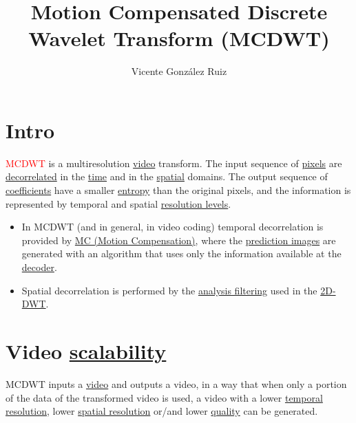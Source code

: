 
\title{Motion Compensated Discrete Wavelet Transform (MCDWT)}

\author{Vicente González Ruiz}

\maketitle
\section{Intro}

\textcolor{red}{MCDWT} is a multiresolution
\href{https://en.wikipedia.org/wiki/Video}{video} transform. The input
sequence of \href{https://en.wikipedia.org/wiki/Pixel}{pixels} are
\href{https://en.wikipedia.org/wiki/Decorrelation}{decorrelated} in
the \href{https://en.wikipedia.org/wiki/Time_domain}{time} and in the
\href{https://www.quora.com/What-is-spatial-domain-in-image-processing}{spatial}
domains. The output sequence of
\href{https://www.quora.com/What-is-spatial-domain-in-image-processing}{coefficients}
have a smaller \href{https://en.wikipedia.org/wiki/Entropy}{entropy}
than the original pixels, and the information is represented by
temporal and spatial
\href{https://en.wikipedia.org/wiki/Image_resolution}{resolution
  levels}.

\begin{itemize}
\item
  In MCDWT (and in general, in video coding) temporal decorrelation is
  provided by
  \href{https://en.wikipedia.org/wiki/Motion_compensation}{MC (Motion
  Compensation)}, where the
  \href{https://en.wikipedia.org/wiki/Decoder}{prediction images} are
  generated with an algorithm that uses only the information available
  at the \href{https://en.wikipedia.org/wiki/Decoder}{decoder}.
\item
  Spatial decorrelation is performed by the
  \href{https://en.wikipedia.org/wiki/Digital_filter\#Analysis_techniques}{analysis
  filtering} used in the
  \href{https://en.wikipedia.org/wiki/Discrete_wavelet_transform}{2D-DWT}.
\end{itemize}

\section{Video \href{http://inst.eecs.berkeley.edu/~ee290t/sp04/lectures/videowavelet_UCB1-3.pdf}{scalability}}
MCDWT inputs a \href{https://en.wikipedia.org/wiki/Video}{video} and
outputs a video, in a way that when only a portion of the data of the
transformed video is used, a video with a lower
\href{https://en.wikipedia.org/wiki/Temporal_resolution}{temporal
resolution}, lower
\href{https://en.wikipedia.org/wiki/Image_resolution\#Spatial_resolution}{spatial
resolution} or/and lower
\href{https://en.wikipedia.org/wiki/Compression_artifact}{quality} can
be generated.

